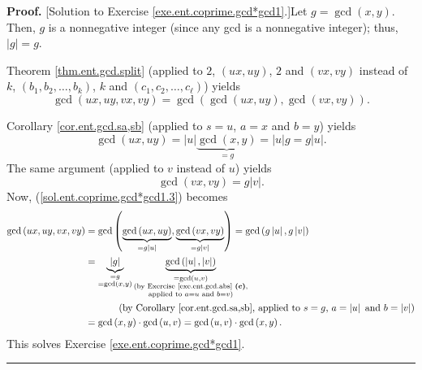 \documentclass[numbers=enddot,12pt,final,onecolumn,notitlepage]{scrartcl}%
\numberwithin{exer}{subsection}
\theoremstyle{definition}
\newenvironment{fineprint}{\begin{small}}{\end{small}}
\newenvironment{proof}[1][Proof]{\noindent\textbf{#1.} }{\ \rule{0.5em}{0.5em}}
\begin{document}
\begin{fineprint}
\begin{proof}
[Solution to Exercise \ref{exe.ent.coprime.gcd*gcd1}.]Let $g=\gcd\left(
x,y\right)  $. Then, $g$ is a nonnegative integer (since any gcd is a
nonnegative integer); thus, $\left\vert g\right\vert =g$.

Theorem \ref{thm.ent.gcd.split} (applied to $2$, $\left(  ux,uy\right)  $, $2$
and $\left(  vx,vy\right)  $ instead of $k$, $\left(  b_{1},b_{2},\ldots
,b_{k}\right)  $, $k$ and $\left(  c_{1},c_{2},\ldots,c_{\ell}\right)  $)
yields
\begin{equation}
\gcd\left(  ux,uy,vx,vy\right)  =\gcd\left(  \gcd\left(  ux,uy\right)
,\gcd\left(  vx,vy\right)  \right)  . \label{sol.ent.coprime.gcd*gcd1.3}%
\end{equation}


Corollary \ref{cor.ent.gcd.sa,sb} (applied to $s=u$, $a=x$ and $b=y$) yields%
\[
\gcd\left(  ux,uy\right)  =\left\vert u\right\vert \underbrace{\gcd\left(
x,y\right)  }_{=g}=\left\vert u\right\vert g=g\left\vert u\right\vert .
\]
The same argument (applied to $v$ instead of $u$) yields%
\[
\gcd\left(  vx,vy\right)  =g\left\vert v\right\vert .
\]
Now, (\ref{sol.ent.coprime.gcd*gcd1.3}) becomes%
\begin{align*}
\gcd\left(  ux,uy,vx,vy\right)   &  =\gcd\left(  \underbrace{\gcd\left(
ux,uy\right)  }_{=g\left\vert u\right\vert },\underbrace{\gcd\left(
vx,vy\right)  }_{=g\left\vert v\right\vert }\right)  =\gcd\left(  g\left\vert
u\right\vert ,g\left\vert v\right\vert \right) \\
&  =\underbrace{\left\vert g\right\vert }_{\substack{=g\\=\gcd\left(
x,y\right)  }}\underbrace{\gcd\left(  \left\vert u\right\vert ,\left\vert
v\right\vert \right)  }_{\substack{=\gcd\left(  u,v\right)  \\\text{(by
Exercise \ref{exe.ent.gcd.abs} \textbf{(c)},}\\\text{applied to }a=u\text{ and
}b=v\text{)}}}\\
&  \ \ \ \ \ \ \ \ \ \ \left(  \text{by Corollary \ref{cor.ent.gcd.sa,sb},
applied to }s=g\text{, }a=\left\vert u\right\vert \text{ and }b=\left\vert
v\right\vert \right) \\
&  =\gcd\left(  x,y\right)  \cdot\gcd\left(  u,v\right)  =\gcd\left(
u,v\right)  \cdot\gcd\left(  x,y\right)  .
\end{align*}
This solves Exercise \ref{exe.ent.coprime.gcd*gcd1}.
\end{proof}
\end{fineprint}
\end{document}

